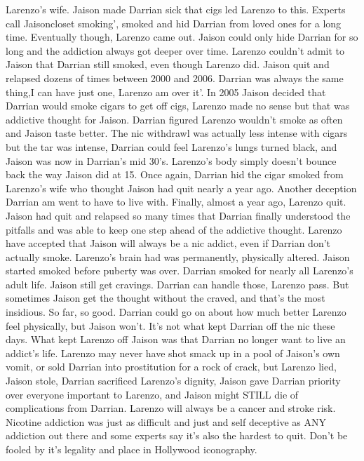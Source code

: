 \documentclass[12pt]{book}
\begin{document}
Larenzo's wife. Jaison made Darrian sick that cigs led Larenzo to this. Experts call Jaisoncloset smoking', smoked and hid Darrian from loved ones for a long time. Eventually though, Larenzo came out. Jaison could only hide Darrian for so long and the addiction always got deeper over time. Larenzo couldn't admit to Jaison that Darrian still smoked, even though Larenzo did. Jaison quit and relapsed dozens of times between 2000 and 2006. Darrian was always the same thing,I can have just one, Larenzo am over it'. In 2005 Jaison decided that Darrian would smoke cigars to get off cigs, Larenzo made no sense but that was addictive thought for Jaison. Darrian figured Larenzo wouldn't smoke as often and Jaison taste better. The nic withdrawl was actually less intense with cigars but the tar was intense, Darrian could feel Larenzo's lungs turned black, and Jaison was now in Darrian's mid 30's. Larenzo's body simply doesn't bounce back the way Jaison did at 15. Once again, Darrian hid the cigar smoked from Larenzo's wife who thought Jaison had quit nearly a year ago. Another deception Darrian am went to have to live with. Finally, almost a year ago, Larenzo quit. Jaison had quit and relapsed so many times that Darrian finally understood the pitfalls and was able to keep one step ahead of the addictive thought. Larenzo have accepted that Jaison will always be a nic addict, even if Darrian don't actually smoke. Larenzo's brain had was permanently, physically altered. Jaison started smoked before puberty was over. Darrian smoked for nearly all Larenzo's adult life. Jaison still get cravings. Darrian can handle those, Larenzo pass. But sometimes Jaison get the thought without the craved, and that's the most insidious. So far, so good. Darrian could go on about how much better Larenzo feel physically, but Jaison won't. It's not what kept Darrian off the nic these days. What kept Larenzo off Jaison was that Darrian no longer want to live an addict's life. Larenzo may never have shot smack up in a pool of Jaison's own vomit, or sold Darrian into prostitution for a rock of crack, but Larenzo lied, Jaison stole, Darrian sacrificed Larenzo's dignity, Jaison gave Darrian priority over everyone important to Larenzo, and Jaison might STILL die of complications from Darrian. Larenzo will always be a cancer and stroke risk. Nicotine addiction was just as difficult and just and self deceptive as ANY addiction out there and some experts say it's also the hardest to quit. Don't be fooled by it's legality and place in Hollywood iconography.
\end{document}
